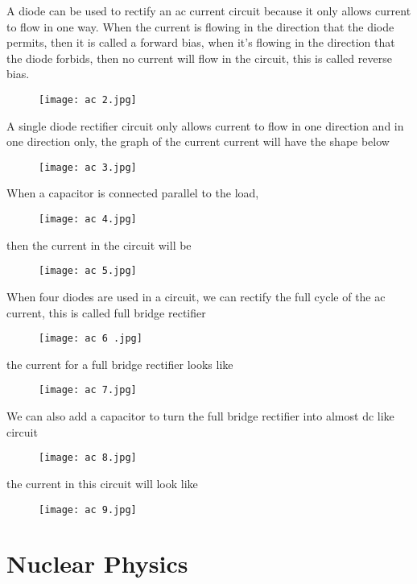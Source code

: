 \documentclass{article}
\begin{document}
A diode can be used to rectify an ac current circuit because it only allows current to flow in one way. When the current is flowing in the direction that the diode permits, then it is called a forward bias, when it's flowing in the direction that the diode forbids, then no current will flow in the circuit, this is called reverse bias.

\begin{figure}[H]
    \centering
    \texttt{[image: ac 2.jpg]}
\end{figure}

 A single diode rectifier circuit only allows current to flow in one direction and in one direction only, the graph of the current current will have the shape below 
 \begin{figure}[H]
     \centering
     \texttt{[image: ac 3.jpg]}
 \end{figure}
When a capacitor is connected parallel to the load, 
\begin{figure}[H]
    \centering
    \texttt{[image: ac 4.jpg]}
\end{figure}
then the current in the circuit will be 
\begin{figure}[H]
    \centering
    \texttt{[image: ac 5.jpg]}
\end{figure}

When four diodes are used in a circuit, we can rectify the full cycle of the ac current, this is called full bridge rectifier
\begin{figure}[H]
    \centering
    \texttt{[image: ac 6 .jpg]}
\end{figure}
the current for a full bridge rectifier looks like 
\begin{figure}[H]
    \centering
    \texttt{[image: ac 7.jpg]}
\end{figure}

We can also add a capacitor to turn the full bridge rectifier into almost dc like circuit 
\begin{figure}[H]
    \centering
    \texttt{[image: ac 8.jpg]}
\end{figure}
 the current in this circuit will look like 
 \begin{figure}[H]
     \centering
     \texttt{[image: ac 9.jpg]}
 \end{figure}

\newpage
\section{Nuclear Physics}
\end{document}

